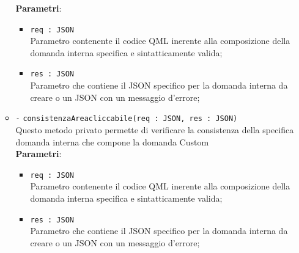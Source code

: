\begin{itemize}
\begin{itemize}
		\textbf{Parametri}:
		\begin{itemize}
			\item \texttt{req : JSON} \\
			Parametro contenente il codice QML inerente alla composizione della domanda interna specifica e sintatticamente valida;
			\item \texttt{res : JSON} \\
			Parametro che contiene il JSON specifico per la domanda interna da creare o un JSON con un messaggio d'errore;
		\end{itemize}
		\item \texttt{-} \texttt{consistenzaAreacliccabile(req : JSON, res : JSON)} \\
		Questo metodo privato permette di verificare la consistenza della specifica domanda interna che compone la domanda Custom \\
		\textbf{Parametri}:
		\begin{itemize}
			\item \texttt{req : JSON} \\
			Parametro contenente il codice QML inerente alla composizione della domanda interna specifica e sintatticamente valida;
			\item \texttt{res : JSON} \\
			Parametro che contiene il JSON specifico per la domanda interna da creare o un JSON con un messaggio d'errore;
		\end{itemize}
	\end{itemize}
\end{itemize}

